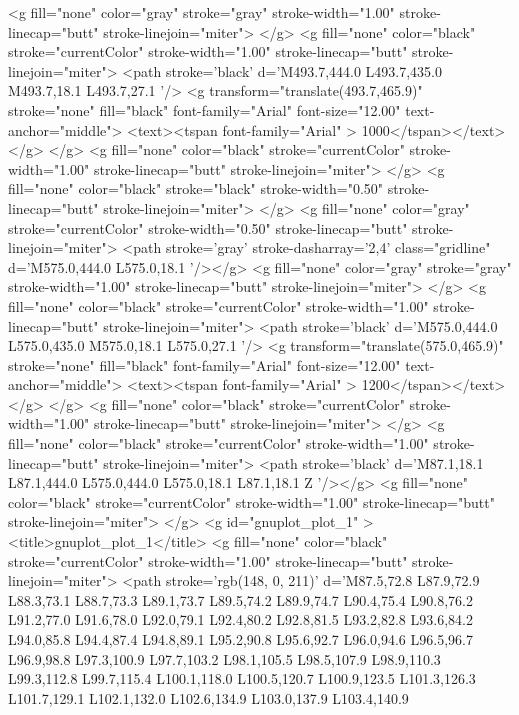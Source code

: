 <g fill="none" color="gray" stroke="gray" stroke-width="1.00" stroke-linecap="butt" stroke-linejoin="miter">
</g>
<g fill="none" color="black" stroke="currentColor" stroke-width="1.00" stroke-linecap="butt" stroke-linejoin="miter">
	<path stroke='black'  d='M493.7,444.0 L493.7,435.0 M493.7,18.1 L493.7,27.1  '/>	<g transform="translate(493.7,465.9)" stroke="none" fill="black" font-family="Arial" font-size="12.00"  text-anchor="middle">
		<text><tspan font-family="Arial" > 1000</tspan></text>
	</g>
</g>
<g fill="none" color="black" stroke="currentColor" stroke-width="1.00" stroke-linecap="butt" stroke-linejoin="miter">
</g>
<g fill="none" color="black" stroke="black" stroke-width="0.50" stroke-linecap="butt" stroke-linejoin="miter">
</g>
<g fill="none" color="gray" stroke="currentColor" stroke-width="0.50" stroke-linecap="butt" stroke-linejoin="miter">
	<path stroke='gray' stroke-dasharray='2,4' class="gridline"  d='M575.0,444.0 L575.0,18.1  '/></g>
<g fill="none" color="gray" stroke="gray" stroke-width="1.00" stroke-linecap="butt" stroke-linejoin="miter">
</g>
<g fill="none" color="black" stroke="currentColor" stroke-width="1.00" stroke-linecap="butt" stroke-linejoin="miter">
	<path stroke='black'  d='M575.0,444.0 L575.0,435.0 M575.0,18.1 L575.0,27.1  '/>	<g transform="translate(575.0,465.9)" stroke="none" fill="black" font-family="Arial" font-size="12.00"  text-anchor="middle">
		<text><tspan font-family="Arial" > 1200</tspan></text>
	</g>
</g>
<g fill="none" color="black" stroke="currentColor" stroke-width="1.00" stroke-linecap="butt" stroke-linejoin="miter">
</g>
<g fill="none" color="black" stroke="currentColor" stroke-width="1.00" stroke-linecap="butt" stroke-linejoin="miter">
	<path stroke='black'  d='M87.1,18.1 L87.1,444.0 L575.0,444.0 L575.0,18.1 L87.1,18.1 Z  '/></g>
<g fill="none" color="black" stroke="currentColor" stroke-width="1.00" stroke-linecap="butt" stroke-linejoin="miter">
</g>
	<g id="gnuplot_plot_1" ><title>gnuplot_plot_1</title>
<g fill="none" color="black" stroke="currentColor" stroke-width="1.00" stroke-linecap="butt" stroke-linejoin="miter">
	<path stroke='rgb(148,   0, 211)'  d='M87.5,72.8 L87.9,72.9 L88.3,73.1 L88.7,73.3 L89.1,73.7 L89.5,74.2 L89.9,74.7 L90.4,75.4
		L90.8,76.2 L91.2,77.0 L91.6,78.0 L92.0,79.1 L92.4,80.2 L92.8,81.5 L93.2,82.8 L93.6,84.2
		L94.0,85.8 L94.4,87.4 L94.8,89.1 L95.2,90.8 L95.6,92.7 L96.0,94.6 L96.5,96.7 L96.9,98.8
		L97.3,100.9 L97.7,103.2 L98.1,105.5 L98.5,107.9 L98.9,110.3 L99.3,112.8 L99.7,115.4 L100.1,118.0
		L100.5,120.7 L100.9,123.5 L101.3,126.3 L101.7,129.1 L102.1,132.0 L102.6,134.9 L103.0,137.9 L103.4,140.9
